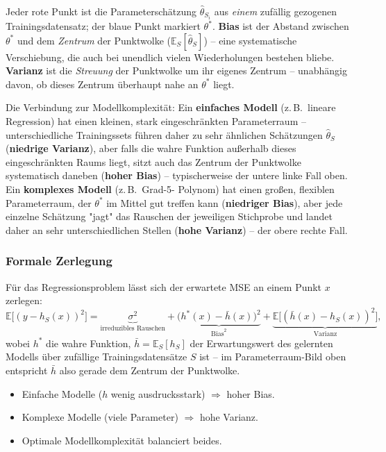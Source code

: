 \documentclass[11pt]{article}
\theoremstyle{csthm}
\theoremstyle{csdef}
\newcommand{\E}{\mathbb{E}}
\begin{document}
\begin{tcolorbox}[defstyle]
Jeder rote Punkt ist die Parameterschätzung $\hat\theta_{S_i}$ aus
\emph{einem} zufällig gezogenen Trainingsdatensatz; der blaue Punkt markiert
$\theta^*$. \textbf{Bias} ist der Abstand zwischen $\theta^*$ und dem
\emph{Zentrum} der Punktwolke ($\E_S[\hat\theta_S]$) -- eine systematische
Verschiebung, die auch bei unendlich vielen Wiederholungen bestehen bliebe.
\textbf{Varianz} ist die \emph{Streuung} der Punktwolke um ihr eigenes
Zentrum -- unabhängig davon, ob dieses Zentrum überhaupt nahe an $\theta^*$
liegt.
\end{tcolorbox}

Die Verbindung zur Modellkomplexität: Ein \textbf{einfaches Modell} (z.\,B.\
lineare Regression) hat einen kleinen, stark eingeschränkten Parameterraum
-- unterschiedliche Trainingssets führen daher zu sehr ähnlichen Schätzungen
$\hat\theta_S$ (\textbf{niedrige Varianz}), aber falls die wahre Funktion
außerhalb dieses eingeschränkten Raums liegt, sitzt auch das Zentrum der
Punktwolke systematisch daneben (\textbf{hoher Bias}) -- typischerweise der
untere linke Fall oben. Ein \textbf{komplexes Modell} (z.\,B.\ Grad-5-
Polynom) hat einen großen, flexiblen Parameterraum, der $\theta^*$ im Mittel
gut treffen kann (\textbf{niedriger Bias}), aber jede einzelne Schätzung
"jagt" das Rauschen der jeweiligen Stichprobe und landet daher an sehr
unterschiedlichen Stellen (\textbf{hohe Varianz}) -- der obere rechte Fall.

\subsubsection*{Formale Zerlegung}

Für das Regressionsproblem lässt sich der erwartete MSE an einem
Punkt $x$ zerlegen:
\begin{equation}
  \E\bigl[(y - h_S(x))^2\bigr]
  = \underbrace{\sigma^2}_{\text{irreduzibles Rauschen}}
  + \underbrace{\bigl(h^*(x) - \bar h(x)\bigr)^2}_{\text{Bias}^2}
  + \underbrace{\E\bigl[(\bar h(x) - h_S(x))^2\bigr]}_{\text{Varianz}},
\end{equation}
wobei $h^*$ die wahre Funktion, $\bar h = \E_S[h_S]$ der Erwartungswert des
gelernten Modells über zufällige Trainingsdatensätze $S$ ist -- im
Parameterraum-Bild oben entspricht $\bar h$ also gerade dem Zentrum der
Punktwolke.

\begin{itemize}
  \item Einfache Modelle ($h$ wenig ausdrucksstark) $\Rightarrow$ hoher Bias.
  \item Komplexe Modelle (viele Parameter) $\Rightarrow$ hohe Varianz.
  \item Optimale Modellkomplexität balanciert beides.
\end{itemize}
\end{document}
